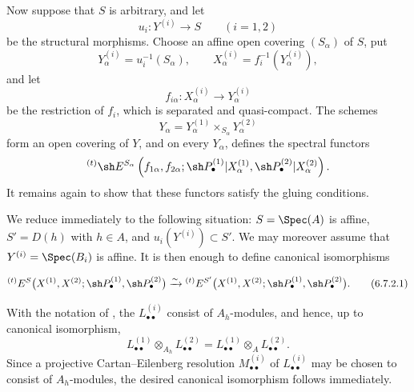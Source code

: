 \begin{env}[6.7.2]
\label{III.6.7.2}
Now suppose that $S$ is arbitrary, and let
\[
  u_i:Y^{(i)}\longrightarrow S
  \qquad(i=1,2)
\]
be the structural morphisms.  Choose an affine open covering
$(S_\alpha)$ of $S$, put
\[
  Y_\alpha^{(i)}=u_i^{-1}(S_\alpha),
  \qquad
  X_\alpha^{(i)}=f_i^{-1}(Y_\alpha^{(i)}),
\]
and let
\[
  f_{i\alpha}:X_\alpha^{(i)}\longrightarrow Y_\alpha^{(i)}
\]
be the restriction of $f_i$, which is separated and
quasi-compact.  The schemes
\[
  Y_\alpha
  =
  Y_\alpha^{(1)}
  \times_{S_\alpha}Y_\alpha^{(2)}
\]
form an open covering of $Y$, and on every $Y_\alpha$,
 defines the spectral functors
\[
  {}^{(t)}\sh E^{S_\alpha}
  \left(
    f_{1\alpha},f_{2\alpha};
    \sh P_\bullet^{(1)}|X_\alpha^{(1)},
    \sh P_\bullet^{(2)}|X_\alpha^{(2)}
  \right).
\]
It remains again to show that these functors satisfy the gluing
conditions.

We reduce immediately to the following situation:
$S=\Spec(A)$ is affine,
$S'=D(h)$ with $h\in A$, and
$u_i(Y^{(i)})\subset S'$.  We may moreover assume that
$Y^{(i)}=\Spec(B_i)$ is affine.  It is then enough to define
canonical isomorphisms
\begin{env}[6.7.2.1]
\label{III.6.7.2.1}
\[
  {}^{(t)}E^S
  \bigl(
    X^{(1)},X^{(2)};
    \sh P_\bullet^{(1)},\sh P_\bullet^{(2)}
  \bigr)
  \xrightarrow{\sim}
  {}^{(t)}E^{S'}
  \bigl(
    X^{(1)},X^{(2)};
    \sh P_\bullet^{(1)},\sh P_\bullet^{(2)}
  \bigr).
  \tag{6.7.2.1}\label{III.6.7.2.1.eq}
\]
\end{env}
With the notation of , the
$L_{\bullet\bullet}^{(i)}$ consist of $A_h$-modules, and hence,
up to canonical isomorphism,
\[
  L_{\bullet\bullet}^{(1)}
  \otimes_{A_h}L_{\bullet\bullet}^{(2)}
  =
  L_{\bullet\bullet}^{(1)}
  \otimes_A L_{\bullet\bullet}^{(2)}.
\]
Since a projective Cartan--Eilenberg resolution
$M_{\bullet\bullet}^{(i)}$ of $L_{\bullet\bullet}^{(i)}$ may be
chosen to consist of $A_h$-modules, the desired canonical
isomorphism follows immediately.
\end{env}

